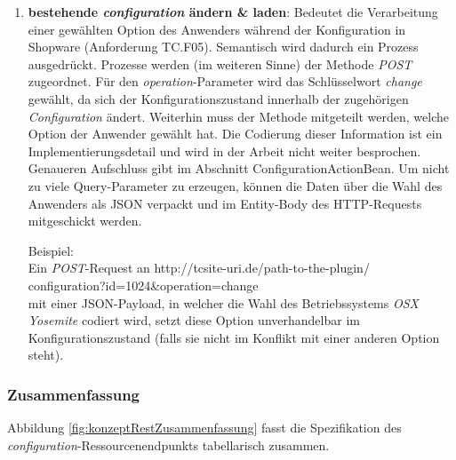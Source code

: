 \documentclass[11pt, a4paper, titlepage, listof=totoc, bibliography=totoc, index=totoc, twoside, openright, headings=normal, draft]{scrreprt}
\begin{document}
\begin{enumerate}
\begin{addmargin}[25pt]{0pt}
Beispiel:\\
Ein \emph{POST}-Request an \glqq http://tcsite-uri.de/path-to-the-plugin/
\\configuration?id=1024\&operation=copy\grqq{}
\\kopiert die \emph{Quotation} mit der ID 1024.
\end{addmargin}
\item \textbf{bestehende \emph{configuration} ändern \& laden}: Bedeutet die Verarbeitung einer gewählten Option des Anwenders während der Konfiguration in Shopware (Anforderung TC.F05). Semantisch wird dadurch ein Prozess ausgedrückt. Prozesse werden (im weiteren Sinne) der Methode \emph{POST} zugeordnet. Für den \emph{operation}-Parameter wird das Schlüsselwort \emph{change} gewählt, da sich der Konfigurationszustand innerhalb der zugehörigen \emph{Configuration} ändert. Weiterhin muss der Methode mitgeteilt werden, welche Option der Anwender gewählt hat. Die Codierung dieser Information ist ein Implementierungsdetail und wird in der Arbeit nicht weiter besprochen. Genaueren Aufschluss gibt \citet{tactonTCsiteDevelopmentManual} im Abschnitt \glqq ConfigurationActionBean\grqq{}. Um nicht zu viele Query-Parameter zu erzeugen, können die Daten über die Wahl des Anwenders als JSON verpackt und im Entity-Body des HTTP-Requests mitgeschickt werden.
\begin{addmargin}[25pt]{0pt} 
Beispiel:\\
Ein \emph{POST}-Request an \glqq http://tcsite-uri.de/path-to-the-plugin/
\\configuration?id=1024\&operation=change\grqq{}
\\mit einer JSON-Payload, in welcher die Wahl des Betriebssystems \emph{OSX Yosemite} codiert wird, setzt diese Option unverhandelbar im Konfigurationszustand (falls sie nicht im Konflikt mit einer anderen Option steht).
\end{addmargin}
\end{enumerate}

\subsubsection{Zusammenfassung}
Abbildung \ref{fig:konzeptRestZusammenfassung} fasst die Spezifikation des  \emph{configuration}-Ressourcenendpunkts tabellarisch zusammen.
\end{document}
